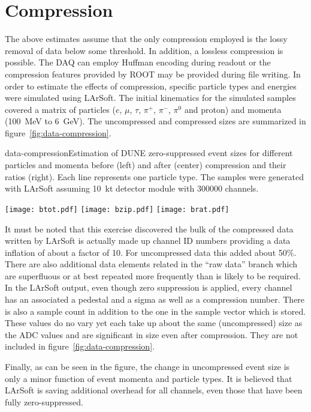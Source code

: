 \section{Compression}

The above estimates assume that the only compression employed is the
lossy removal of data below some threshold.
In addition, a lossless compression is possible.
The DAQ can employ Huffman encoding during readout or the compression
features provided by ROOT may be provided during file writing.
In order to estimate the effects of compression, specific particle
types and energies were simulated using LArSoft.
The initial kinematics for the simulated samples covered a matrix of
particles ($e$, $\mu$, $\tau$, $\pi^+$, $\pi^-$, $\pi^0$ and proton) and momenta
(\SI{100}{\MeV} to \SI{6}{\GeV}).
The uncompressed and compressed sizes are summarized in figure~\ref{fig:data-compression}.

\begin{cdrfigure}{data-compression}{Estimation of DUNE zero-suppressed event sizes for
    different particles and momenta before (left) and after (center)
    compression and their ratios (right).
    Each line represents one particle type.
    The samples were generated with LArSoft assuming
    \SI{10}{\kilo\tonne} detector module with \num{300000} channels.}

  \texttt{[image: btot.pdf]}
  \texttt{[image: bzip.pdf]}
  \texttt{[image: brat.pdf]}

\end{cdrfigure}

It must be noted that this exercise discovered the bulk of the
compressed data written by LArSoft is actually made up channel ID
numbers providing a data inflation of about a factor of 10.
For uncompressed data this added about 50\%.
There are also additional data elements related in the ``raw data''
branch which are superfluous or at best repeated more frequently than
is likely to be required.
In the LArSoft output, even though zero suppression is applied, every
channel has an associated a pedestal and a sigma as well as a
compression number.
There is also a sample count in addition to the one in the sample
vector which is stored.
These values do no vary yet each take up about the same (uncompressed)
size as the ADC values and are significant in size even after
compression.
They are not included in figure~\ref{fig:data-compression}.

Finally, as can be seen in the figure, the change in uncompressed
event size is only a minor function of event momenta and particle types.
It is believed that LArSoft is saving additional overhead for all
channels, even those that have been fully zero-suppressed.

